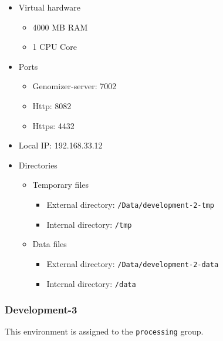 \begin{itemize}
\itemsep1pt\parskip0pt
\item
  Virtual hardware

  \begin{itemize}
  \itemsep1pt\parskip0pt
  \item
    4000 MB RAM
  \item
    1 CPU Core
  \end{itemize}
\item
  Ports

  \begin{itemize}
  \itemsep1pt\parskip0pt
  \item
    Genomizer-server: 7002
  \item
    Http: 8082
  \item
    Https: 4432
  \end{itemize}
\item
  Local IP: 192.168.33.12
\item
  Directories

  \begin{itemize}
  \itemsep1pt\parskip0pt
  \item
    Temporary files

    \begin{itemize}
    \itemsep1pt\parskip0pt
    \item
      External directory: \texttt{/Data/development-2-tmp}
    \item
      Internal directory: \texttt{/tmp}
    \end{itemize}
  \item
    Data files

    \begin{itemize}
    \itemsep1pt\parskip0pt
    \item
      External directory: \texttt{/Data/development-2-data}
    \item
      Internal directory: \texttt{/data}
    \end{itemize}
  \end{itemize}
\end{itemize}

\subsubsection{Development-3}\label{sec:development-3}

This environment is assigned to the \texttt{processing} group.


